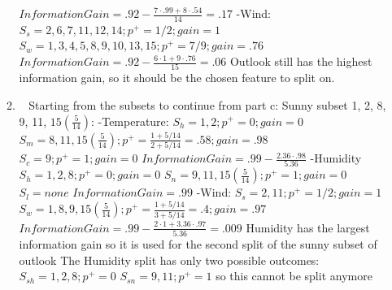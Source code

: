 \documentclass[12pt, fullpage,letterpaper]{article}
\begin{document}
\begin{enumerate}
\begin{enumerate}
	\newline $Information Gain=.92-\frac{7\cdot.99+8\cdot.54}{14}=.17$
	\newline -Wind:
	\newline $S_s = 2, 6, 7, 11, 12, 14; p^+=1/2;  gain=1$
	\newline $S_w=1, 3, 4, 5, 8, 9, 10, 13, 15; p^+=7/9;  gain=.76$
	\newline $Information Gain=.92-\frac{6\cdot1+9\cdot.76}{15}=.06$
	\newline
	\newline Outlook still has the highest information gain, so it should be the chosen feature to split on.
\item~
\newline Starting from the subsets to continue from part c:
\newline Sunny subset 1, 2, 8, 9, 11, $15(\frac{5}{14})$:
\newline -Temperature:
	\newline $S_h = 1, 2; p^+=0;  gain=0$
	\newline $S_m=8, 11, 15(\frac{5}{14}); p^+=\frac{1+5/14}{2+5/14}=.58;  gain=.98$
	\newline $S_c=9; p^+=1;  gain=0$
	\newline $Information Gain=.99-\frac{2.36\cdot.98}{5.36}$
	\newline -Humidity
	\newline $S_h = 1, 2, 8; p^+=0;  gain=0$
	\newline $S_n=9, 11, 15(\frac{5}{14}); p^+=1; gain=0$
	\newline $S_l=none$
	\newline $Information Gain=.99$
	\newline -Wind:
	\newline $S_s = 2,11; p^+=1/2;  gain=1$
	\newline $S_w=1, 8, 9, 15(\frac{5}{14}); p^+=\frac{1+5/14}{3+5/14}=.4;  gain=.97$
	\newline $Information Gain=.99-\frac{2\cdot1+3.36\cdot.97}{5.36}=.009$
	\newline Humidity has the largest information gain so it is used for the second split of the sunny subset of outlook
	\newline
	\newline The Humidity split has only two possible outcomes: 
	\newline $S_{sh}=1, 2, 8; p^+ =0$
	\newline $S_{sn}=9, 11; p^+ =1$
	\newline so this cannot be split anymore

\end{enumerate}
\end{enumerate}
\end{document}
